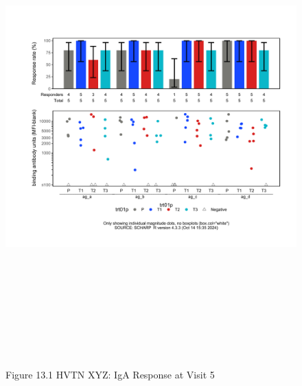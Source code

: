 \documentclass[12pt]{article}
\begin{document}
\begin{figure}[H]

{\centering \includegraphics[width=8.75in,height=7.25in]{test_cases_files/figure-latex/unnamed-chunk-26-1} 

}

\caption[Figure 13.1 boxplot (pos. response boxplots)]{Figure 13.1 HVTN XYZ: IgA Response at Visit 5}\label{fig:unnamed-chunk-26}
\end{figure}
\clearpage
\end{document}
